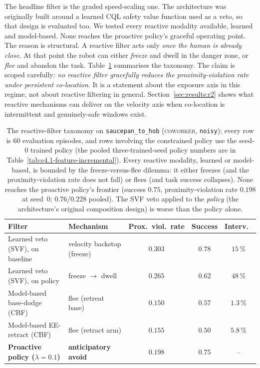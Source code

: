 \documentclass[11pt,a4paper]{report}
\newcommand{\coworker}{\textsc{coworker}}
\begin{document}
The headline filter is the graded speed-scaling one. The architecture
was originally built around a learned \textsc{CQL} safety value
function used as a veto, so that design is evaluated too. We tested
every reactive modality available, learned and model-based. None
reaches the proactive policy's graceful operating point. The reason is
structural. A reactive filter acts only \emph{once the human is already
close}. At that point the robot can either \emph{freeze} and dwell in
the danger zone, or \emph{flee} and abandon the task.
Table~\ref{tab:filter-taxonomy} summarises the taxonomy. The claim is
scoped carefully: \emph{no reactive filter gracefully reduces the
proximity-violation rate under persistent co-location}. It is a
statement about the exposure axis in this regime, not about reactive
filtering in general.
Section~\ref{sec:results:r2} shows what reactive mechanisms can
deliver on the velocity axis when co-location is intermittent and
genuinely-safe windows exist.

\begin{table}[htbp]
\centering
\caption{The reactive-filter taxonomy on \texttt{saucepan\_to\_hob}
(\coworker{}, \texttt{noisy}); every row is 60 evaluation episodes,
and rows involving the constrained policy use the seed-0 trained
policy (the pooled three-trained-seed policy numbers are in
Table~\ref{tab:e4.1-feature-incremental}). Every reactive modality,
learned or model-based, is bounded by the freeze-versus-flee dilemma:
it either freezes (and the proximity-violation rate does not fall) or
flees (and task success collapses). None reaches the proactive policy's
frontier (success $0.75$, proximity-violation rate $0.198$ at seed~0;
$0.76$/$0.228$ pooled).
The SVF veto applied to the \emph{policy} (the architecture's
original composition design) is worse than the policy alone.}
\label{tab:filter-taxonomy}
\small
\begin{tabular}{llccc}
\toprule
Filter & Mechanism & Prox.\ viol.\ rate & Success & Interv.\ \\
\midrule
Learned veto (SVF), on baseline   & velocity backstop (freeze) & $0.303$ & $0.78$ & $15\,\%$ \\
Learned veto (SVF), on policy     & freeze $\to$ dwell         & $0.265$ & $0.62$ & $48\,\%$ \\
Model-based base-dodge (CBF)      & flee (retreat base)        & $0.150$ & $0.57$ & $1.3\,\%$ \\
Model-based EE-retract (CBF)      & flee (retract arm)         & $0.155$ & $0.50$ & $5.8\,\%$ \\
\textbf{Proactive policy ($\lambda{=}0.1$)} & \textbf{anticipatory avoid} & $\mathbf{0.198}$ & $\mathbf{0.75}$ & -- \\
\bottomrule
\end{tabular}
\end{table}
\end{document}
